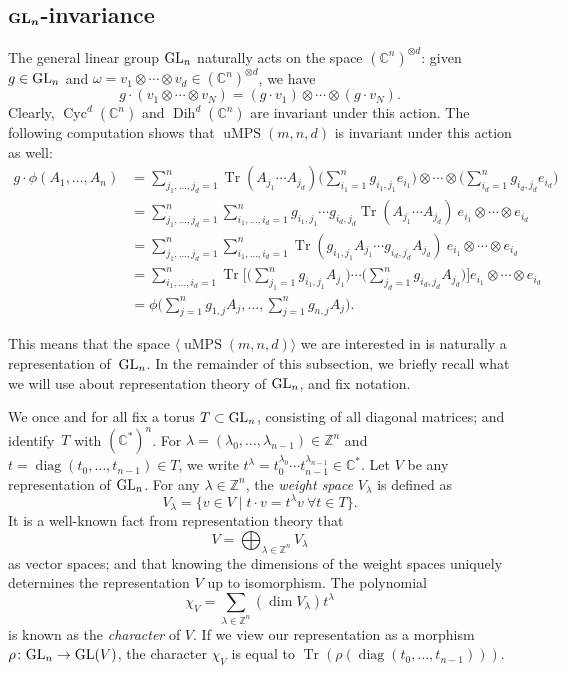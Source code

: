 \documentclass[pdftex]{sigma}
\numberwithin{equation}{section}
\DeclareMathOperator{\Tr}{Tr}
\DeclareMathOperator{\diag}{diag}
\newcommand{\ZZ}{\mathbb{Z}}
\newcommand{\CC}{\mathbb{C}}
\DeclareMathOperator{\uMPS}{uMPS}
\DeclareMathOperator{\Cyc}{Cyc}
\DeclareMathOperator{\Dih}{Dih}
\begin{document}
\subsection[GL_n-invariance]{$\boldsymbol{{\rm GL}_n}$-invariance}
The general linear group ${\rm GL}_n$ naturally acts on the space $({\mathbb C}^n)^{\otimes d}$: given $g\in {\rm GL}_n$ and $\omega=v_1 \otimes \cdots \otimes v_d\in ({\mathbb C}^n)^{\otimes d}$, we have
 \begin{equation*}%
 g\cdot (v_1\otimes \cdots \otimes v_N)= (g \cdot v_1)\otimes \cdots \otimes (g\cdot v_N).
 \end{equation*}
 Clearly, $\Cyc^d({\mathbb C}^n)$ and $\Dih^d({\mathbb C}^n)$ are invariant under this action. The following computation shows that $\uMPS(m,n,d)$ is invariant under this action as well:
 \begin{align*}
 	g\cdot \phi(A_1,\dots ,A_n)
 	&=\sum_{j_1,\dots, j_d=1}^{n} \Tr(A_{j_1}\cdots A_{j_d})  \bigg(\sum_{i_1=1}^{n}{g_{i_1,j_1}e_{i_1}}\bigg)\otimes \cdots \otimes \bigg(\sum_{i_d=1}^{n}{g_{i_d,j_d}e_{i_d}}\bigg) \\
 	&=\sum_{j_1,\dots, j_d=1}^{n} \sum_{i_1,\dots,i_d=1}^n g_{i_1,j_1} \cdots g_{i_d,j_d}\Tr(A_{j_1}\cdots A_{j_d}) \ e_{i_1}\otimes \cdots \otimes e_{i_d} \nonumber \\
 	&=\sum_{j_1,\dots, j_d=1}^{n} \sum_{i_1,\dots,i_d=1}^n \Tr(g_{i_1,j_1} A_{j_1}\cdots g_{i_d,j_d} A_{j_d}) \ e_{i_1}\otimes \cdots \otimes e_{i_d}\nonumber \\
 	&=\sum_{i_1,\dots,i_d=1}^n\Tr\bigg[\bigg(\sum_{j_1=1}^n g_{i_1,j_1}A_{j_1}\Big)\cdots \Big(\sum_{j_d=1}^n g_{i_d,j_d}A_{j_d}\bigg)\bigg]e_{i_1}\otimes \cdots \otimes e_{i_d}\nonumber \\
 	&= \phi\bigg(\sum_{j=1}^n g_{1,j} A_j, \dots ,\sum_{j=1}^n g_{n,j} A_j\bigg). \nonumber
 \end{align*}

 This means that the space $\langle \uMPS(m,n,d) \rangle$ we are interested in is naturally a representation of~${\rm GL}_n$.
 In the remainder of this subsection, we briefly recall what we will use about representation theory of ${\rm GL}_n$, and fix notation.

We once and for all fix a torus $T \subset {\rm GL}_n$, consisting of all diagonal matrices; and identify~$T$ with $(\CC^*)^n$.
For $\lambda=(\lambda_0,\dots,\lambda_{n-1}) \in \ZZ^n$ and $t=\diag(t_0,\dots,t_{n-1}) \in T$, we write $t^\lambda = t_0^{\lambda_0} \cdots t_{n-1}^{\lambda_{n-1}} \in \CC^*$.
Let $V$ be any representation of ${\rm GL}_n$.
For any $\lambda \in \ZZ^n$, the \emph{weight space} $V_{\lambda}$ is defined as
\[
V_{\lambda} = \big\{v \in V \mid t\cdot v = t^\lambda v \  \forall t \in T\big\}.
\]
It is a well-known fact from representation theory that
\[
V = \bigoplus_{\lambda \in \ZZ^n}{V_{\lambda}}
\]
as vector spaces; and that knowing the dimensions of the weight spaces uniquely determines the representation $V$ up to isomorphism.
The polynomial
\[
\chi_V = \sum_{\lambda \in \ZZ^n}{(\dim V_{\lambda}) t^{\lambda}}
\]
is known as the \emph{character} of $V$. If we view our representation as a morphism $\rho\colon {\rm GL}_n \to {\rm GL}(V)$, the character $\chi_V$ is equal to $\Tr(\rho(\diag(t_0,\dots,t_{n-1})))$.
\end{document}
